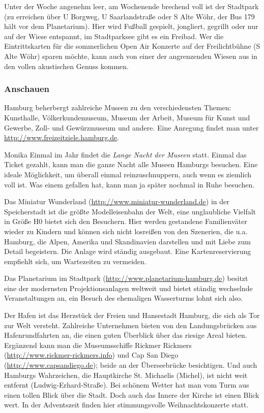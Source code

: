Unter der Woche angenehm leer, am Wochenende brechend voll ist der Stadtpark
(zu erreichen über U Borgweg, U Saarlandstraße oder S Alte Wöhr, der Bus 179
hält vor dem Planetarium). Hier wird Fußball gespielt, jongliert, gegrillt oder
nur auf der Wiese entspannt, im Stadtparksee gibt es ein Freibad. Wer die
Eintrittskarten für die sommerlichen Open Air Konzerte auf der Freilichtbühne
(S Alte Wöhr) sparen möchte, kann auch von einer der angrenzenden Wiesen aus in
den vollen akustischen Genuss kommen.

\subsubsection{Anschauen}

Hamburg beherbergt zahlreiche Museen zu den verschiedensten Themen: Kunsthalle,
Völkerkundemuseum, Museum der Arbeit, Museum für Kunst und Gewerbe, Zoll- und
Gewürzmuseum und andere. Eine Anregung findet man unter
\url{http://www.freizeitziele.hamburg.de}.

\begin{advice}{Monika}
Einmal im Jahr findet die \emph{Lange Nacht der Museen} statt. Einmal das
Ticket gezahlt, kann man die ganze Nacht alle Museen Hamburgs besuchen. Eine
ideale Möglichkeit, um überall einmal reinzuschnuppern, auch wenn es ziemlich
voll ist. Was einem gefallen hat, kann man ja später nochmal in Ruhe besuchen.
\end{advice}

Das Miniatur Wunderland (\url{http://www.miniatur-wunderland.de}) in der
Speicherstadt ist die größte Modelleisenbahn der Welt, eine unglaubliche
Vielfalt in Größe H0 bietet sich den Besuchern. Hier werden gestandene
Familienväter wieder zu Kindern und können sich nicht losreißen von den
Szenerien, die u.a. Hamburg, die Alpen, Amerika und Skandinavien darstellen und
mit Liebe zum Detail begeistern. Die Anlage wird ständig ausgebaut. Eine
Kartenreservierung empfiehlt sich, um Wartezeiten zu vermeiden.

Das Planetarium im Stadtpark (\url{http://www.planetarium-hamburg.de}) besitzt
eine der modernsten Projektionsanlagen weltweit und bietet ständig wechselnde
Veranstaltungen an, ein Besuch des ehemaligen Wasserturms lohnt sich also.

Der Hafen ist das Herzstück der Freien und Hansestadt Hamburg, die sich als Tor
zur Welt versteht. Zahlreiche Unternehmen bieten von den Landungsbrücken aus
Hafenrundfahrten an, die einen guten Überblick über das riesige Areal bieten.
Ergänzend kann man die Museumsschiffe Rickmer Rickmers
(\url{http://www.rickmer-rickmers.info}) und Cap San Diego
(\url{http://www.capsandiego.de}); beide an der Überseebrücke besichtigen. Und
auch Hamburgs Wahrzeichen, die Hauptkirche St. Michaelis (Michel), ist nicht
weit entfernt (Ludwig-Erhard-Straße). Bei schönem Wetter hat man vom Turm aus
einen tollen Blick über die Stadt. Doch auch das Innere der Kirche ist einen
Blick wert. In der Adventszeit finden hier stimmungsvolle Weihnachtskonzerte
statt.

